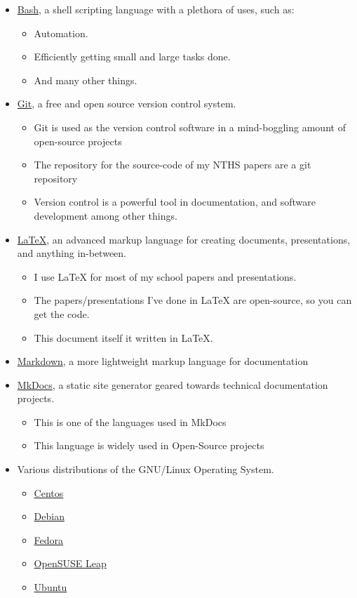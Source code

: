 \begin{itemize}
	\item {\href{https://www.gnu.org/software/bash/}{Bash}, a shell scripting language with a plethora of uses, such as:}
		\begin{itemize}
			\item Automation.
			\item Efficiently getting small and large tasks done.
			\item And many other things.
		\end{itemize}
	\item {\href{https://git-scm.com/}{Git}, a free and open source version control system.}
		\begin{itemize}
			\item Git is used as the version control software in a mind-boggling amount of open-source projects
			\item The repository for the source-code of my NTHS papers are a git repository
			\item Version control is a powerful tool in documentation, and software development among other things.
		\end{itemize}
	\item {\href{https://www.latex-project.org/}{\LaTeX{}}, an advanced markup language for creating documents, presentations, and anything in-between.}
		\begin{itemize}
			\item I use \LaTeX{} for most of my school papers and presentations.
			\item The papers/presentations I've done in \LaTeX{} are open-source, so you can get the code.
			\item This document itself it written in \LaTeX{}.
		\end{itemize}
	\item {\href{https://guides.github.com/features/mastering-markdown/}{Markdown}, a more lightweight markup language for documentation}
	\item { \href{http://www.mkdocs.org/}{MkDocs}, a static site generator geared towards technical documentation projects.}
		\begin{itemize}
			\item This is one of the languages used in MkDocs
			\item This language is widely used in Open-Source projects
		\end{itemize}
	\item {Various distributions of the GNU/Linux Operating System.}
		\begin{itemize}
			\item {\href{https://www.centos.org/}{Centos}}
			\item {\href{https://www.debian.org/}{Debian}}
			\item {\href{https://getfedora.org/}{Fedora}}
			\item {\href{https://www.opensuse.org/}{OpenSUSE Leap}}
			\item {\href{https://www.ubuntu.com/}{Ubuntu}}
		\end{itemize}
\end{itemize}

